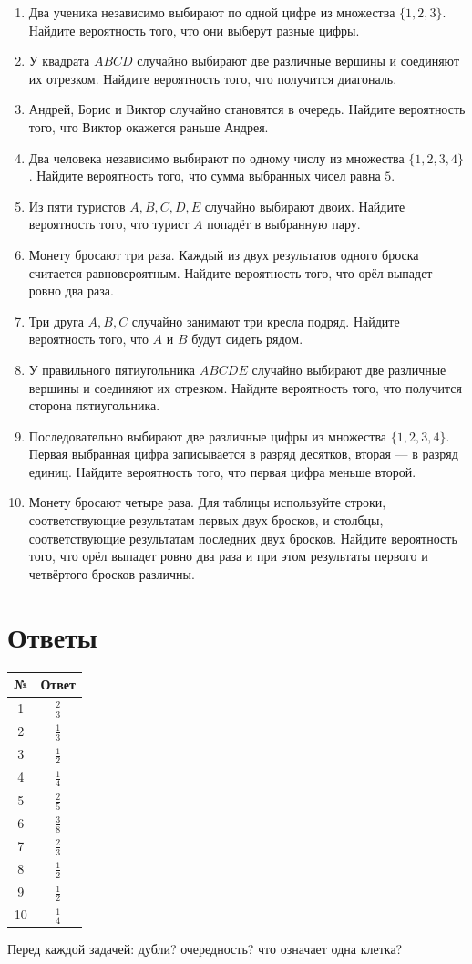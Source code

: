 \documentclass[a4paper,12pt]{article}
\begin{document}
\begin{enumerate}
\item Два ученика независимо выбирают по одной цифре из множества $\{1,2,3\}$.
Найдите вероятность того, что они выберут разные цифры.
\item У квадрата $ABCD$ случайно выбирают две различные вершины и соединяют их
отрезком. Найдите вероятность того, что получится диагональ.
\item Андрей, Борис и Виктор случайно становятся в очередь. Найдите вероятность
того, что Виктор окажется раньше Андрея.
\item Два человека независимо выбирают по одному числу из множества
$\{1,2,3,4\}$. Найдите вероятность того, что сумма выбранных чисел равна $5$.
\item Из пяти туристов $A,B,C,D,E$ случайно выбирают двоих. Найдите вероятность
того, что турист $A$ попадёт в выбранную пару.
\item Монету бросают три раза. Каждый из двух результатов одного броска считается
равновероятным. Найдите вероятность того, что орёл выпадет ровно два раза.
\item Три друга $A,B,C$ случайно занимают три кресла подряд. Найдите вероятность
того, что $A$ и $B$ будут сидеть рядом.
\item У правильного пятиугольника $ABCDE$ случайно выбирают две различные вершины
и соединяют их отрезком. Найдите вероятность того, что получится сторона
пятиугольника.
\item Последовательно выбирают две различные цифры из множества $\{1,2,3,4\}$.
Первая выбранная цифра записывается в разряд десятков, вторая --- в разряд единиц.
Найдите вероятность того, что первая цифра меньше второй.
\item Монету бросают четыре раза. Для таблицы используйте строки, соответствующие
результатам первых двух бросков, и столбцы, соответствующие результатам последних
двух бросков. Найдите вероятность того, что орёл выпадет ровно два раза и при
этом результаты первого и четвёртого бросков различны.
\end{enumerate}

\clearpage
\section*{Ответы}

\begin{tabular}{@{}cc@{}}
\toprule
№ & Ответ\\
\midrule
1 & $\frac23$\\
2 & $\frac13$\\
3 & $\frac12$\\
4 & $\frac14$\\
5 & $\frac25$\\
6 & $\frac38$\\
7 & $\frac23$\\
8 & $\frac12$\\
9 & $\frac12$\\
10 & $\frac14$\\
\bottomrule
\end{tabular}

\vfill
\begin{center}
\textcolor{softgray}{Перед каждой задачей: дубли? очередность? что означает одна клетка?}
\end{center}
\end{document}
